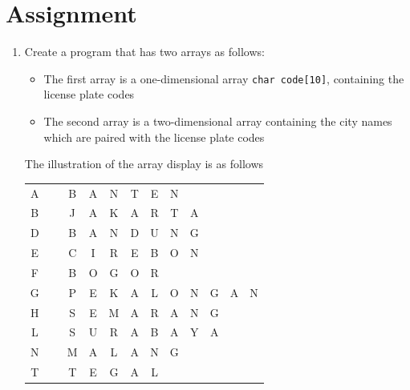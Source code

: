\documentclass[12pt,titlepage]{article}
\begin{document}
\pagebreak

\section{Assignment}
\begin{enumerate}
    \item {
        Create a program that has two arrays as follows:
        \begin{itemize}
            \item The first array is a one-dimensional array \texttt{char code[10]}, containing the license plate codes
            \item The second array is a two-dimensional array containing the city names which are paired with the license plate codes
        \end{itemize}
        The illustration of the array display is as follows
        \begin{table}[h]
            \centering
            \ttfamily \begin{tabular}[h]{|c|c|c|c|c|c|c|c|c|c|c|c|}
                \cline{1-1} \cline{3-12}
                A & ~ & B & A & N & T & E & N & ~ & ~ & ~ & ~ \\
                \cline{1-1} \cline{3-12}
                B & ~ & J & A & K & A & R & T & A & ~ & ~ & ~ \\
                \cline{1-1} \cline{3-12}
                D & ~ & B & A & N & D & U & N & G & ~ & ~ & ~ \\
                \cline{1-1} \cline{3-12}
                E & ~ & C & I & R & E & B & O & N & ~ & ~ & ~ \\
                \cline{1-1} \cline{3-12}
                F & ~ & B & O & G & O & R & ~ & ~ & ~ & ~ & ~ \\
                \cline{1-1} \cline{3-12}
                G & ~ & P & E & K & A & L & O & N & G & A & N \\
                \cline{1-1} \cline{3-12}
                H & ~ & S & E & M & A & R & A & N & G & ~ & ~ \\
                \cline{1-1} \cline{3-12}
                L & ~ & S & U & R & A & B & A & Y & A & ~ & ~ \\
                \cline{1-1} \cline{3-12}
                N & ~ & M & A & L & A & N & G & ~ & ~ & ~ & ~ \\
                \cline{1-1} \cline{3-12}
                T & ~ & T & E & G & A & L & ~ & ~ & ~ & ~ & ~ \\
                \cline{1-1} \cline{3-12}
            \end{tabular}
        \end{table}

}
\end{enumerate}
\end{document}
